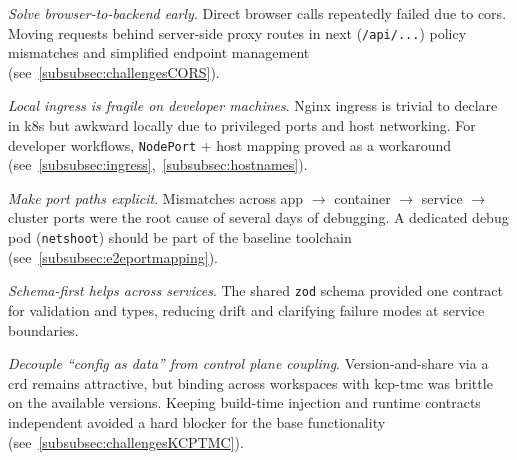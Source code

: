 \documentclass[11pt, a4paper, oneside, listof=totoc]{scrartcl}
\begin{document}
            \begin{enumerate}[label={[\arabic*]:},
                ref=Challenge~\arabic*,
                leftmargin=*,
                itemsep=0.6\baselineskip]

                \item\label{chal:evalLessonsCORS}
                    \textit{Solve browser-to-backend early}.
                    Direct browser calls repeatedly failed due to \gls{cors}.
                    Moving requests behind server-side proxy routes in \gls{next} (\texttt{/api/...})%
                    \@eliminated policy mismatches and simplified endpoint management
                    (see~\autoref{subsubsec:challengesCORS}).

                \item\label{chal:evalLessonsIngress}
                    \textit{Local \gls{ingress} is fragile on developer machines}.
                    Nginx \gls{ingress} is trivial to declare in \gls{k8s} but awkward locally due to
                    privileged ports and host networking.
                    For developer workflows, \texttt{NodePort} + host mapping proved as a workaround
                    (see~\autoref{subsubsec:ingress},~\autoref{subsubsec:hostnames}).

                \item\label{Make port paths explicit}
                    \textit{Make port paths explicit}.
                    Mismatches across app $\rightarrow$ container $\rightarrow$ service
                    $\rightarrow$ cluster ports were the root cause of several days of debugging.
                    A dedicated debug pod (\texttt{netshoot}) should be part of the baseline
                    toolchain (see~\autoref{subsubsec:e2eportmapping}).

                \item\label{chal:evalLessonsSchemaFirst}
                    \textit{Schema-first helps across services}.
                    The shared \texttt{zod} schema provided one contract for validation and types,
                    reducing drift and clarifying failure modes at service boundaries.

                \item\label{chal:evalLessonsDecoupleConfig}
                    \textit{Decouple \enquote{config as data} from control plane coupling}.
                    Version-and-share via a \gls{crd} remains attractive, but binding across
                    workspaces with \gls{kcp}-\gls{tmc} was brittle on the available versions.
                    Keeping build-time injection and runtime contracts independent avoided a hard
                    blocker for the base functionality (see~\autoref{subsubsec:challengesKCPTMC}).


\end{enumerate}
\end{document}

